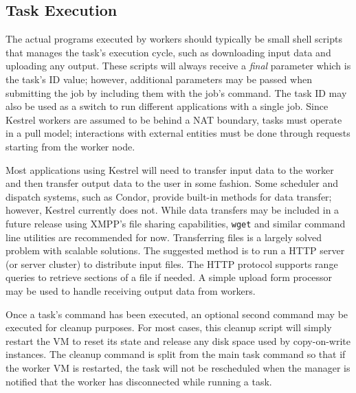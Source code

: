 \subsection{Task Execution}

\label{sec:Kestrel:Execution} The actual programs executed by workers
should typically be small shell scripts that manages the task's execution
cycle, such as downloading input data and uploading any output. These
scripts will always receive a \textit{final} parameter which is the
task's ID value; however, additional parameters may be passed when
submitting the job by including them with the job's command. The task
ID may also be used as a switch to run different applications with
a single job. Since Kestrel workers are assumed to be behind a NAT
boundary, tasks must operate in a pull model; interactions with external
entities must be done through requests starting from the worker node.

Most applications using Kestrel will need to transfer input data to
the worker and then transfer output data to the user in some fashion.
Some scheduler and dispatch systems, such as Condor, provide built-in
methods for data transfer; however, Kestrel currently does not. While
data transfers may be included in a future release using XMPP's file
sharing capabilities, \texttt{wget} and similar command line utilities
are recommended for now. Transferring files is a largely solved problem
with scalable solutions. The suggested method is to run a HTTP server
(or server cluster) to distribute input files. The HTTP protocol supports
range queries to retrieve sections of a file if needed. A simple upload
form processor may be used to handle receiving output data from workers.

Once a task's command has been executed, an optional second command
may be executed for cleanup purposes. For most cases, this cleanup
script will simply restart the VM to reset its state and release any
disk space used by copy-on-write instances. The cleanup command is
split from the main task command so that if the worker VM is restarted,
the task will not be rescheduled when the manager is notified that
the worker has disconnected while running a task.

